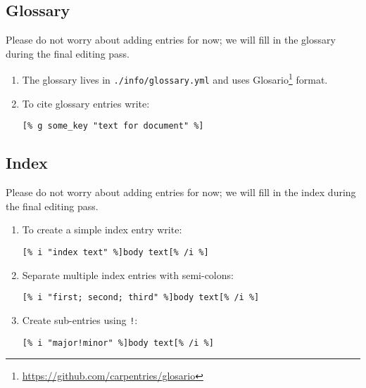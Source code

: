 \documentclass{scrbook}
\newcommand{\hreffoot}[2]{{#1}\footnote{\href{#2}{#2}}}
\begin{document}
\subsection*{Glossary}


Please do not worry about adding entries for now;
we will fill in the glossary during the final editing pass.

\begin{enumerate}

\item 

The glossary lives in \texttt{./info/glossary.yml} and uses \hreffoot{Glosario}{https://github.com/carpentries/glosario} format.



\item 

To cite glossary entries write:

\begin{lstlisting}[frame=single,frameround=tttt]
[% g some_key "text for document" %]
\end{lstlisting}



\end{enumerate}

\subsection*{Index}


Please do not worry about adding entries for now;
we will fill in the index during the final editing pass.

\begin{enumerate}

\item 

To create a simple index entry write:

\begin{lstlisting}[frame=single,frameround=tttt]
[% i "index text" %]body text[% /i %]
\end{lstlisting}



\item 

Separate multiple index entries with semi-colons:

\begin{lstlisting}[frame=single,frameround=tttt]
[% i "first; second; third" %]body text[% /i %]
\end{lstlisting}



\item 

Create sub-entries using \texttt{!}:

\begin{lstlisting}[frame=single,frameround=tttt]
[% i "major!minor" %]body text[% /i %]
\end{lstlisting}



\end{enumerate}
\end{document}
